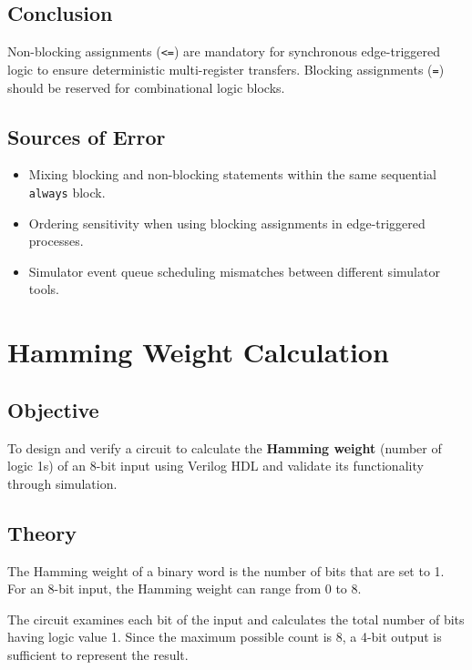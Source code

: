 \documentclass[12pt,a4paper]{report}
\begin{document}
\section{Conclusion}

Non-blocking assignments (\texttt{<=}) are mandatory for synchronous edge-triggered logic to ensure deterministic multi-register transfers. Blocking assignments (\texttt{=}) should be reserved for combinational logic blocks.

\section{Sources of Error}

\begin{itemize}
    \item Mixing blocking and non-blocking statements within the same sequential \texttt{always} block.
    \item Ordering sensitivity when using blocking assignments in edge-triggered processes.
    \item Simulator event queue scheduling mismatches between different simulator tools.
\end{itemize} 

\chapter{Hamming Weight Calculation}
\label{ch:pdf18}

\section{Objective}

To design and verify a circuit to calculate the \textbf{Hamming weight} (number of logic 1s) of an 8-bit input using Verilog HDL and validate its functionality through simulation.

\section{Theory}

The Hamming weight of a binary word is the number of bits that are set to 1. For an 8-bit input, the Hamming weight can range from 0 to 8.

The circuit examines each bit of the input and calculates the total number of bits having logic value 1. Since the maximum possible count is 8, a 4-bit output is sufficient to represent the result.
\end{document}
